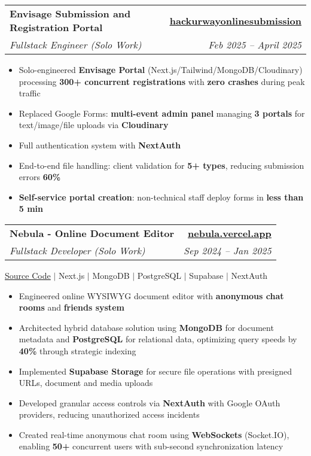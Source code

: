 \documentclass[letterpaper,11pt]{article}
\makeatletter
\newcommand{\resumeItem}[1]{
  \item\small{
    {#1 \vspace{0pt}}
  }
}
\newcommand{\resumeSubheading}[4]{
  \vspace{-2pt}\item
    \begin{tabular*}{1.0\textwidth}[t]{l@{\extracolsep{\fill}}r}
      \textbf{#1} & \textbf{\small #2} \\
      \textit{\small#3} & \textit{\small #4} \\
    \end{tabular*}\vspace{-7pt}
}
\newcommand{\resumeItemListStart}{\begin{itemize}}
\newcommand{\resumeItemListEnd}{\end{itemize}\vspace{-5pt}}
\makeatother
\begin{document}
    \vspace{0pt}

            \resumeSubheading{Envisage Submission and Registration Portal}{\href{https://hackurwayonlinesubmission.vercel.app}{\color{blue}\underline{hackurwayonlinesubmission}}}{Fullstack Engineer (Solo Work)}{Feb 2025 -- April 2025} 
               \resumeItemListStart
    \resumeItem{Solo-engineered \textbf{Envisage Portal} (Next.js/Tailwind/MongoDB/Cloudinary) processing \textbf{300+ concurrent registrations} with \textbf{zero crashes} during peak traffic}
    \resumeItem{Replaced Google Forms: \textbf{multi-event admin panel} managing \textbf{3 portals} for text/image/file uploads via \textbf{Cloudinary}}
    \resumeItem{Full authentication system with \textbf{NextAuth}}
    \resumeItem{End-to-end file handling: client validation for \textbf{5+ types}, reducing submission errors \textbf{60\%}}
    \resumeItem{\textbf{Self-service portal creation}: non-technical staff deploy forms in \textbf{less than 5 min}}
\resumeItemListEnd
            
\vspace{-2pt}
 \resumeSubheading{Nebula - Online Document Editor}{\href{https://nebula.vercel.app}{\color{blue}\underline{nebula.vercel.app}}}{Fullstack Developer (Solo Work)}{Sep 2024 -- Jan 2025} 
    
        
        \href{https://github.com/abhraneeldhar7/nebula}{\color{blue}\underline{Source Code}} $|$
        {Next.js $|$ MongoDB $|$ PostgreSQL $|$ Supabase $|$ NextAuth}
        
        \resumeItemListStart
            \resumeItem{Engineered online WYSIWYG document editor with \textbf{anonymous chat rooms} and \textbf{friends system}}
            \resumeItem{Architected hybrid database solution using \textbf{MongoDB} for document metadata and \textbf{PostgreSQL} for relational data, optimizing query speeds by \textbf{40\%} through strategic indexing}
            \resumeItem{Implemented \textbf{Supabase Storage} for secure file operations with presigned URLs, document and media uploads}
            \resumeItem{Developed granular access controls via \textbf{NextAuth} with Google OAuth providers, reducing unauthorized access incidents}
            \resumeItem{Created real-time anonymous chat room using \textbf{WebSockets} (Socket.IO), enabling \textbf{50+} concurrent users with sub-second synchronization latency}
        \resumeItemListEnd


\vspace{-15pt}
\end{document}
